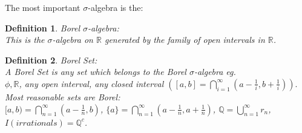 \documentclass[12pt]{article}
\def\QQ{\mathbb{Q}}
\def\RR{\mathbb{R}}
\newtheorem{mydef}{Definition}
\begin{document}
The most important $\sigma$-algebra is the:

\begin{mydef}{Borel $\sigma$-algebra:}\\
This is the $\sigma$-algebra on $\RR$ generated by the family of open intervals in $\RR$.
\end{mydef}

\begin{mydef}{Borel Set:}\\
A Borel Set is any set which belongs to the Borel $\sigma$-algebra eg.\\ $\phi, \RR$, any open interval, any closed interval $([a,b]=\bigcap_{i=1}^{\infty}(a - \frac{1}{i}, b + \frac{1}{i})).$\\ Most reasonable sets are Borel:\\
$[a,b)=\bigcap_{n=1}^{\infty}(a - \frac{1}{n}, b)$, $\{a\}=\bigcap_{n=1}^{\infty}(a - \frac{1}{n}, a + \frac{1}{n})$, $\QQ=\bigcup_{n=1}^{\infty}r_n$, $I(irrationals)=\QQ^{c}$.
\end{mydef}
\end{document}
